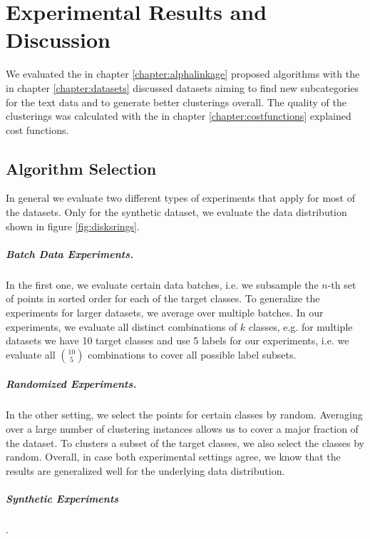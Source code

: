 \chapter{Experimental Results and Discussion}
\label{sec:results}


We evaluated the in chapter \ref{chapter:alphalinkage} proposed algorithms with the in chapter \ref{chapter:datasets} discussed datasets aiming to find new subcategories for the text data and to generate better clusterings overall. The quality of the clusterings was calculated with the in chapter \ref{chapter:costfunctions} explained cost functions.

\section{Algorithm Selection}

In general we evaluate two different types of experiments that apply for most of the datasets. Only for the synthetic dataset, we evaluate the data distribution shown in figure \ref{fig:disksrings}.

\paragraph{Batch Data Experiments.} In the first one, we evaluate certain data batches, i.e. we subsample the $n$-th set of points in sorted order for each of the target classes. To generalize the experiments for larger datasets, we average over multiple batches. In our experiments, we evaluate all distinct combinations of $k$ classes, e.g. for multiple datasets we have 10 target classes and use 5 labels for our experiments, i.e. we evaluate all $10 \choose 5$ combinations to cover all possible label subsets.

\paragraph{Randomized Experiments.} In the other setting, we select the points for certain classes by random. Averaging over a large number of clustering instances allows us to cover a major fraction of the dataset. To clusters a subset of the target classes, we also select the classes by random. Overall, in case both experimental settings agree, we know that the results are generalized well for the underlying data distribution.

\paragraph{Synthetic Experiments}.

